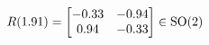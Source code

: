 \documentclass[preview]{standalone}
\begin{document}
\begin{align*}
\special{dvisvgm:raw <g id='unique000'>}R(1.91) = \begin{bmatrix} -0.33 & -0.94 \\ 0.94 & -0.33 \end{bmatrix} \in \text{SO}(2)\special{dvisvgm:raw </g>}
\end{align*}
\end{document}
